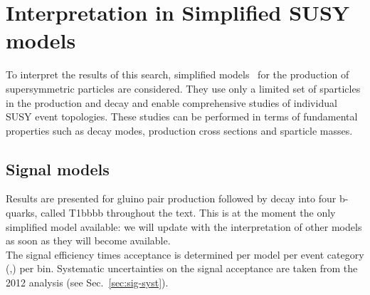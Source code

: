 \section{Interpretation in Simplified SUSY models}
\label{sec:susy}
To interpret the results of this search, simplified
models~\cite{Alwall:2008ag,Alwall:2008va,Alves:2011wf} for the production of supersymmetric particles are considered. 
They use only a limited set of sparticles in the production and
decay and enable comprehensive studies of individual SUSY event
topologies. These studies can be performed in terms of
fundamental properties such as decay modes, production cross sections and sparticle masses. 

\subsection{Signal models}
\label{subsec:susy_models}

Results are presented for gluino pair production followed by decay into four b-quarks, called T1bbbb throughout the text.
This is at the moment the only simplified model available: we will update with the interpretation of other models as soon as they will become available.\\
The signal efficiency times acceptance is determined per model per event
category (\njet,\nb) per \HT bin. 
Systematic uncertainties on the signal acceptance are taken from the 2012 analysis (see Sec.~\ref{sec:sig-syst}). 


